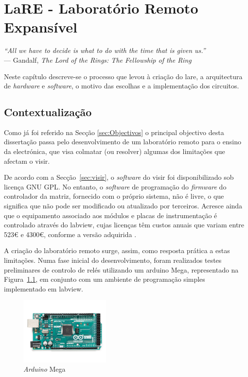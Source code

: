 \chapter{LaRE - Laboratório Remoto Expansível}
\label{Capítulo3}
\begin{flushright}
\textit{``All we have to decide is what to do with the time that is given us.''} \\[0.5em]
--- Gandalf, \textit{The Lord of the Rings: The Fellowship of the Ring}
\end{flushright}

Neste capítulo descreve-se o processo que levou à criação do \acrshort{lare}, a arquitectura de \textit{hardware} e \textit{software}, o motivo das escolhas e a implementação dos circuitos.

\section{Contextualização}
\label{sec:contextualização}
Como já foi referido na Secção \ref{sec:Objectivos} o principal objectivo desta dissertação passa pelo desenvolvimento de um \acrshort{laboratório remoto} para o ensino da electrónica, que visa colmatar (ou resolver) algumas dos limitações que afectam o \acrshort{visir}.

De acordo com a Secção~\ref{sec:visir}, o \textit{software} do \acrshort{visir} foi disponibilizado sob licença GNU GPL. No entanto, o \textit{software} de programação do \textit{firmware} do controlador da matriz, fornecido com o próprio sistema, não é livre, o que significa que não pode ser modificado ou atualizado por terceiros. Acresce ainda que o equipamento associado aos módulos e placas de instrumentação é controlado através do \acrshort{labview}, cujas licenças têm custos anuais que variam entre 523€ e 4300€, conforme a versão adquirida \cite{labviewpricing}.

A criação do \acrshort{laboratório remoto} surge, assim, como resposta prática a estas limitações. Numa fase inicial do desenvolvimento, foram realizados testes preliminares de controlo de relés utilizando um \gls{arduino} Mega, representado na Figura~\ref{fig:arduinomega}, em conjunto com um ambiente de programação simples implementado em \acrshort{labview}.

\begin{figure}[hbtp]
    \centering
    \includegraphics[width=0.4\textwidth]{figures/arduinomega.png}
    \caption{\textit{Arduino} Mega \cite{ArduinoMega}}
    \label{fig:arduinomega}
\end{figure}

